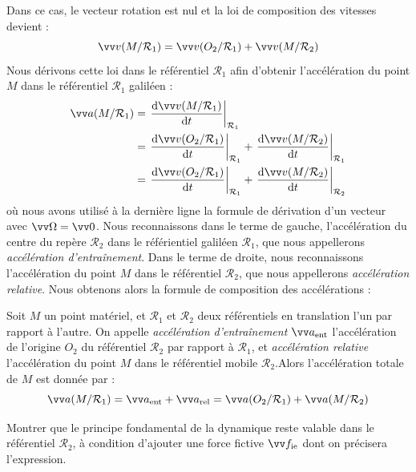 \documentclass[11pt,fleqn]{book} %
\newcommand{\dd}{\mathrm{d}}
\newcommand{\rref}{\mathcal{R}}
\begin{document}
Dans ce cas, le vecteur rotation est nul et la loi de composition des vitesses devient :
\begin{equation}
	\vv v(M/\rref_1) = \vv v(O_2/\rref_1) + \vv v(M/\rref_2)
\end{equation}
Nous dérivons cette loi dans le référentiel $\rref_1$ afin d'obtenir l'accélération du point $M$ dans le référentiel $\rref_1$ galiléen :
\begin{align}
	\vv a(M/\rref_1) &= \left. \frac{\dd \vv v(M/\rref_1)}{\dd t}\right|_{\rref_1} \\
	&= \left. \frac{\dd \vv v(O_2/\rref_1)}{\dd t}\right|_{\rref_1} + \left. \frac{\dd \vv v(M/\rref_2)}{\dd t}\right|_{\rref_1} \\
	&= \left. \frac{\dd \vv v(O_2/\rref_1)}{\dd t}\right|_{\rref_1} + \left. \frac{\dd \vv v(M/\rref_2)}{\dd t}\right|_{\rref_2} 
\end{align}
où nous avons utilisé à la dernière ligne la formule de dérivation d'un vecteur avec $\vv \Omega = \vv 0$. Nous reconnaissons dans le terme de gauche, l'accélération du centre du repère $\rref_2$ dans le référientiel galiléen $\rref_1$, que nous appellerons \textit{accélération d'entraînement}. Dans le terme de droite, nous reconnaissons l'accélération du point $M$ dans le référentiel $\rref_2$, que nous appellerons \textit{accélération relative}. Nous obtenons alors la formule de composition des accélérations :
\begin{proposition}
	Soit $M$ un point matériel, et $\rref_1$ et $\rref_2$ deux référentiels en translation l'un par rapport à l'autre. On appelle \textit{accélération d'entraînement} $\vv a_{\rm ent}$ l'accélération de l'origine $O_2$ du référentiel $\rref_2$ par rapport à $\rref_1$, et \textit{accélération relative} l'accélération du point $M$ dans le référentiel mobile $\rref_2$.Alors l'accélération totale de $M$ est donnée par :
	\begin{equation}
		\vv a(M/\rref_1) = \vv a_{\rm ent} + \vv a_{\rm rel} = \vv a(O_2/\rref_1) + \vv a(M/\rref_2)
	\end{equation}
\end{proposition}

\begin{capex}
	Montrer que le principe fondamental de la dynamique reste valable dans le référentiel $\rref_2$, à condition d'ajouter une force fictive $\vv f_{\rm ie}$ dont on précisera l'expression.
\end{capex}
\end{document}
